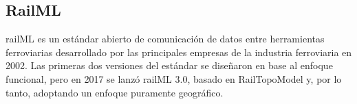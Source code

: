 \subsection{RailML}
    \label{sec:railML}
    
    railML es un estándar abierto de comunicación de datos entre herramientas ferroviarias desarrollado por las principales empresas de la industria ferroviaria en 2002. Las primeras dos versiones del estándar se diseñaron en base al enfoque funcional, pero en 2017 se lanzó railML 3.0, basado en RailTopoModel y, por lo tanto, adoptando un enfoque puramente geográfico.


